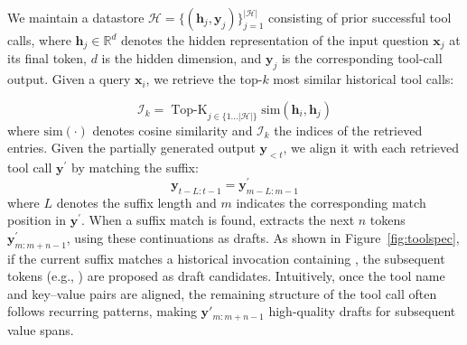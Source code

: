 

We maintain a datastore $\mathcal{H}=\{(\boldsymbol{h}_j, \boldsymbol{y}_j)\}_{j=1}^{|\mathcal{H}|}$ consisting of prior successful tool calls, where $\boldsymbol{h}_j \in \mathbb{R}^d$ denotes the hidden representation of the input question $\boldsymbol{x}_j$ at its final token, $d$ is the hidden dimension, and $\boldsymbol{y}_j$ is the corresponding tool-call output. Given a query $\boldsymbol{x}_i$, we retrieve the top-$k$ most similar historical tool calls:

\begin{equation}
    \mathcal{I}_k = \operatorname{Top-K}_{j \in \{1 \ldots |\mathcal{H}|\}} \text{sim}(\boldsymbol{h}_i, \boldsymbol{h}_j)
\end{equation}
where $\text{sim}(\cdot)$ denotes cosine similarity and $\mathcal{I}_k$ the indices of the retrieved entries. Given the partially generated output $\boldsymbol{y}_{<t}$, we align it with each retrieved tool call $\boldsymbol{y}^{\prime}$ by matching the suffix:
\begin{equation}
\boldsymbol{y}_{t-L:t-1}=\boldsymbol{y}^{\prime}_{m-L:m-1}
\end{equation}
where $L$ denotes the suffix length and $m$ indicates the corresponding match position in $\boldsymbol{y}^{\prime}$. When a suffix match is found, \method extracts the next $n$ tokens $\boldsymbol{y}^{\prime}_{m:m+n-1}$, using these continuations as drafts. As shown in Figure~\ref{fig:toolspec}, if the current suffix matches a historical invocation containing , the subsequent tokens (e.g., ) are proposed as draft candidates. Intuitively, once the tool name and key–value pairs are aligned, the remaining structure of the tool call often follows recurring patterns, making $\boldsymbol{y}'_{m:m+n-1}$ high-quality drafts for subsequent value spans.


